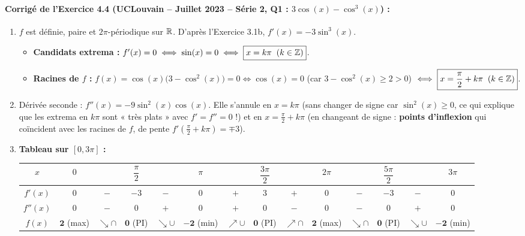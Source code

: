 \paragraph{Corrigé de l'Exercice 4.4 (UCLouvain -- Juillet 2023 -- Série 2, Q1 : $3\cos(x) - \cos^3(x)$) :}
\begin{enumerate}[label=(\alph*)]
    \item $f$ est définie, paire et $2\pi$-périodique sur $\mathbb{R}$. D'après l'Exercice 3.1b, $\boxed{f'(x) = -3\sin^3(x)}$.
    \begin{itemize}
        \item \textbf{Candidats extrema :} $f'(x) = 0 \iff \sin(x) = 0 \iff \boxed{x = k\pi \;\;(k \in \mathbb{Z})}$.
        \item \textbf{Racines de $f$ :} $f(x) = \cos(x)\bigl(3 - \cos^2(x)\bigr) = 0 \iff \cos(x) = 0$ (car $3 - \cos^2(x) \ge 2 > 0$) $\iff \boxed{x = \frac{\pi}{2} + k\pi \;\;(k \in \mathbb{Z})}$.
    \end{itemize}
    \item Dérivée seconde : $\boxed{f''(x) = -9\sin^2(x)\cos(x)}$. Elle s'annule en $x = k\pi$ (sans changer de signe car $\sin^2(x) \ge 0$, ce qui explique que les extrema en $k\pi$ sont « très plats » avec $f' = f'' = 0$ !) et en $x = \frac{\pi}{2} + k\pi$ (en changeant de signe : \textbf{points d'inflexion} qui coïncident avec les racines de $f$, de pente $f'(\frac{\pi}{2}+k\pi) = \mp 3$).
    \item \textbf{Tableau sur $[0, 3\pi]$ :}
    \begin{center}
    {\scriptsize
    \renewcommand{\arraystretch}{1.35}
    \setlength{\tabcolsep}{2.2pt}
    \begin{tabular}{|c||c|c|c|c|c|c|c|c|c|c|c|c|c|}
    \hline
    $x$ & $0$ & & $\dfrac{\pi}{2}$ & & $\pi$ & & $\dfrac{3\pi}{2}$ & & $2\pi$ & & $\dfrac{5\pi}{2}$ & & $3\pi$ \\ \hline\hline
    $f'(x)$ & $0$ & $-$ & $-3$ & $-$ & $0$ & $+$ & $3$ & $+$ & $0$ & $-$ & $-3$ & $-$ & $0$ \\ \hline
    $f''(x)$ & $0$ & $-$ & $0$ & $+$ & $0$ & $+$ & $0$ & $-$ & $0$ & $-$ & $0$ & $+$ & $0$ \\ \hline
    $f(x)$ & $\mathbf{2}$ (max) & $\searrow\cap$ & $\mathbf{0}$ (PI) & $\searrow\cup$ & $\mathbf{-2}$ (min) & $\nearrow\cup$ & $\mathbf{0}$ (PI) & $\nearrow\cap$ & $\mathbf{2}$ (max) & $\searrow\cap$ & $\mathbf{0}$ (PI) & $\searrow\cup$ & $\mathbf{-2}$ (min) \\ \hline
    \end{tabular}
    }
    \end{center}
\end{enumerate}

